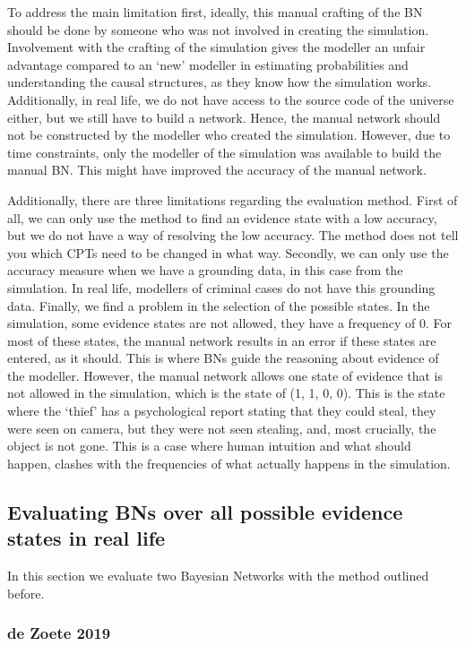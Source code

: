 \documentclass[12pt]{article}
\begin{document}
To address the main limitation first, ideally, this manual crafting of the BN should be done by someone who was not involved in creating the simulation. Involvement with the crafting of the simulation gives the modeller an unfair advantage compared to an `new' modeller in estimating probabilities and understanding the causal structures, as they know how the simulation works. Additionally, in real life, we do not have access to the source code of the universe either, but we still have to build a network. Hence, the manual network should not be constructed by the modeller who created the simulation. However, due to time constraints, only the modeller of the simulation was available to build the manual BN. This might have improved the accuracy of the manual network.

Additionally, there are three limitations regarding the evaluation method. First of all, we can only use the method to find an evidence state with a low accuracy, but we do not have a way of resolving the low accuracy. The method does not tell you which CPTs need to be changed in what way. Secondly, we can only use the accuracy measure when we have a grounding data, in this case from the simulation. In real life, modellers of criminal cases do not have this grounding data. Finally, we find a problem in the selection of the possible states. In the simulation, some evidence states are not allowed, they have a frequency of 0. For most of these states, the manual network results in an error if these states are entered, as it should. This is where BNs guide the reasoning about evidence of the modeller. However, the manual network allows one state of evidence that is not allowed in the simulation, which is the state of (1, 1, 0, 0). This is the state where the `thief' has a psychological report stating that they could steal, they were seen on camera, but they were not seen stealing, and, most crucially, the object is not gone. This is a case where human intuition and what should happen, clashes with the frequencies of what actually happens in the simulation.


\subsection{Evaluating BNs over all possible evidence states in real life}

In this section we evaluate two Bayesian Networks with the method outlined before. 

 \subsubsection{de Zoete 2019}
 
\end{document}

